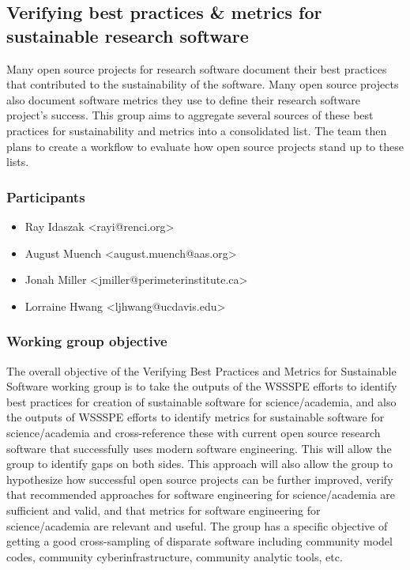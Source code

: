 \subsection{Verifying best practices \& metrics for sustainable research software}
\label{sec:best-practices-sustainable}


Many open source projects for research software document their best practices that
contributed to the sustainability of the software.  Many open source projects also
document software metrics they use to define their research software project's success.
This group aims to aggregate several sources of these best practices for sustainability and
metrics into a consolidated list. The team then plans to create a workflow to
evaluate how open source projects stand up to these lists.

\subsubsection{Participants}

\begin{itemize}
\item Ray Idaszak <rayi@renci.org>
\item August Muench <august.muench@aas.org>
\item Jonah Miller <jmiller@perimeterinstitute.ca>
\item Lorraine Hwang <ljhwang@ucdavis.edu>
\end{itemize}

\subsubsection{Working group objective}

The overall objective of the Verifying Best Practices and Metrics for Sustainable Software working group is to take the outputs of the WSSSPE efforts to identify best practices for creation of sustainable software for science/academia, and also the outputs of WSSSPE efforts to identify metrics for sustainable software for science/academia and cross-reference these with current open source research software that successfully uses modern software engineering.  This will allow the group to identify gaps on both sides.  This approach will also allow the group to hypothesize how successful open source projects can be further improved, verify that recommended approaches for software engineering for science/academia are sufficient and valid, and that metrics for software engineering for science/academia are relevant and useful.  The group has a specific objective of getting a good cross-sampling of disparate software including community model codes, community cyberinfrastructure, community analytic tools, etc.

